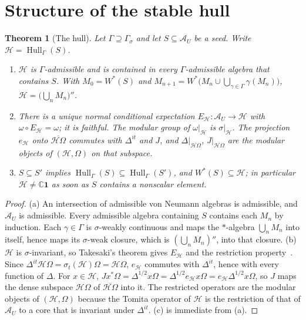 \documentclass[12pt]{article}
\newtheorem{theorem}{Theorem}[section]
\theoremstyle{definition}
\theoremstyle{remark}
\newcommand{\Hull}{\operatorname{Hull}}
\newcommand{\AU}{\mathcal A_U}
\begin{document}
\section{Structure of the stable hull}\label{sec:hull}

\begin{theorem}[The hull]\label{thm:hull}
Let \(\Gamma\supseteq\Gamma_\sigma\) and let \(S\subseteq\AU\) be a seed. Write
\(\mathcal H=\Hull_\Gamma(S)\).
\begin{enumerate}[label=(\alph*),leftmargin=2em]
\item \(\mathcal H\) is \(\Gamma\)-admissible and is contained in every
  \(\Gamma\)-admissible algebra that contains \(S\). With \(M_0=W^*(S)\) and
  \(M_{n+1}=W^*\bigl(M_n\cup\bigcup_{\gamma\in\Gamma}\gamma(M_n)\bigr)\),
  \(\mathcal H=\bigl(\bigcup_nM_n\bigr)''\).
\item There is a unique normal conditional expectation \(E_{\mathcal H}:\AU\to\mathcal H\)
  with \(\omega\circ E_{\mathcal H}=\omega\); it is faithful. The modular group of
  \(\omega|_{\mathcal H}\) is \(\sigma|_{\mathcal H}\). The projection
  \(e_{\mathcal H}\) onto \(\overline{\mathcal H\Omega}\) commutes with \(\Delta^{it}\)
  and \(J\), and \(\Delta|_{\overline{\mathcal H\Omega}}\),
  \(J|_{\overline{\mathcal H\Omega}}\) are the modular objects of
  \((\mathcal H,\Omega)\) on that subspace.
\item \(S\subseteq S'\) implies \(\Hull_\Gamma(S)\subseteq\Hull_\Gamma(S')\), and
  \(W^*(S)\subseteq\mathcal H\); in particular \(\mathcal H\neq\mathbb C\mathbf 1\) as
  soon as \(S\) contains a nonscalar element.
\end{enumerate}
\end{theorem}

\begin{proof}
(a) An intersection of admissible von Neumann algebras is admissible, and \(\AU\) is
admissible. Every admissible algebra containing \(S\) contains each \(M_n\) by
induction. Each \(\gamma\in\Gamma\) is \(\sigma\)-weakly continuous and maps the
\(*\)-algebra \(\bigcup_nM_n\) into itself, hence maps its \(\sigma\)-weak closure, which
is \((\bigcup_nM_n)''\), into that closure. (b) \(\mathcal H\) is \(\sigma\)-invariant,
so Takesaki's theorem gives \(E_{\mathcal H}\) and the restriction
property~\cite{Takesaki1972}. Since \(\Delta^{it}\mathcal H\Omega=\sigma_t(\mathcal H)\Omega
=\mathcal H\Omega\), \(e_{\mathcal H}\) commutes with \(\Delta^{it}\), hence with every
function of \(\Delta\). For \(x\in\mathcal H\), \(Jx^*\Omega=\Delta^{1/2}x\Omega
=\Delta^{1/2}e_{\mathcal H}x\Omega=e_{\mathcal H}\Delta^{1/2}x\Omega\), so \(J\) maps the
dense subspace \(\mathcal H\Omega\) of \(\overline{\mathcal H\Omega}\) into it. The
restricted operators are the modular objects of \((\mathcal H,\Omega)\) because the
Tomita operator of \(\mathcal H\) is the restriction of that of \(\AU\) to a core that
is invariant under \(\Delta^{it}\). (c) is immediate from (a).
\end{proof}
\end{document}
